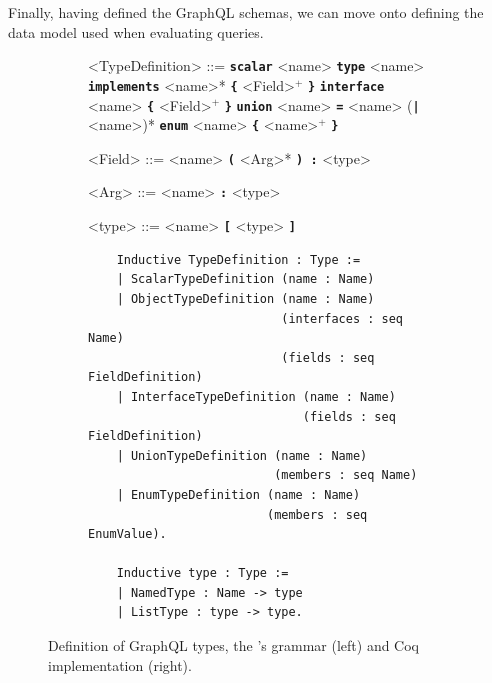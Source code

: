 
Finally, having defined the GraphQL schemas, we can move onto defining the data model used when evaluating queries.

\setlength{\grammarparsep}{10pt plus 1pt minus 1pt} %
\begin{figure}
    \centering
    \begin{subfigure}{.5\textwidth}
    \begin{grammar}
    <TypeDefinition> ::= \textbf{\texttt{scalar}} <name>
    \alt \textbf{\texttt{type}} <name> \textbf{\texttt{implements}} <name>* \textbf{\texttt{\{}} <Field>$^{+}$ \textbf{\texttt{\}}}
    \alt \textbf{\texttt{interface}} <name> \textbf{\texttt{\{}} <Field>$^{+}$ \textbf{\texttt{\}}}
    \alt \textbf{\texttt{union}} <name> \textbf{\texttt{=}} <name> (\textbf{\texttt{|}} <name>)*
    \alt \textbf{\texttt{enum}} <name>  \textbf{\texttt{\{}}  <name>$^{+}$ \textbf{\texttt{\}}}

    <Field> ::= <name> \textbf{\texttt{(}} <Arg>* \textbf{\texttt{) :}} <type>

    <Arg> ::= <name> \textbf{\texttt{:}} <type>

    <type> ::= <name>
    \alt \textbf{\texttt{[}}  <type> \textbf{\texttt{]}}
    \end{grammar}

    \end{subfigure}%
    \begin{subfigure}{.5\textwidth}
    \begin{verbatim}
    Inductive TypeDefinition : Type :=
    | ScalarTypeDefinition (name : Name)
    | ObjectTypeDefinition (name : Name)
                           (interfaces : seq Name)
                           (fields : seq FieldDefinition)
    | InterfaceTypeDefinition (name : Name)
                              (fields : seq FieldDefinition)
    | UnionTypeDefinition (name : Name)
                          (members : seq Name)
    | EnumTypeDefinition (name : Name)
                         (members : seq EnumValue).

    Inductive type : Type :=
    | NamedType : Name -> type
    | ListType : type -> type.
    \end{verbatim}

    \end{subfigure}
    \caption{Definition of GraphQL types, the \spec{}'s grammar (left) and Coq implementation (right).}
    \label{fig:types_def}
\end{figure}



